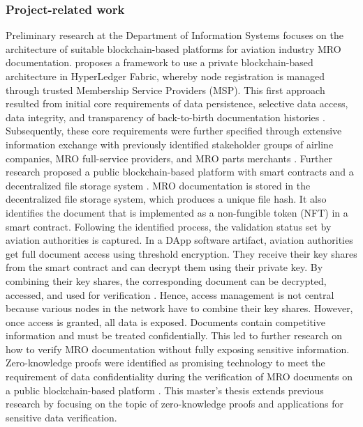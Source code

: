\subsubsection{Project-related work}
Preliminary research at the Department of Information Systems focuses on the architecture of suitable blockchain-based platforms for aviation industry MRO documentation. \citet{WickboldtMeiseKliewer} proposes a framework to use a private blockchain-based architecture in HyperLedger Fabric, whereby node registration is managed through trusted Membership Service Providers (MSP). This first approach resulted from initial core requirements of data persistence, selective data access, data integrity, and transparency of back-to-birth documentation histories \citep{WickboldtClemens2018BzdD}. Subsequently, these core requirements were further specified through extensive information exchange with previously identified stakeholder groups of airline companies, MRO full-service providers, and MRO parts merchants \citep{ZedelJ}. Further research proposed a public blockchain-based platform with smart contracts and a decentralized file storage system \citep{semesterproject, ZedelJ}. MRO documentation is stored in the decentralized file storage system, which produces a unique file hash. It also identifies the document that is implemented as a non-fungible token (NFT) in a smart contract. Following the identified process, the validation status set by aviation authorities is captured. In a DApp software artifact, aviation authorities get full document access using threshold encryption. They receive their key shares from the smart contract and can decrypt them using their private key. By combining their key shares, the corresponding document can be decrypted, accessed, and used for verification \citep{semesterproject}. Hence, access management is not central because various nodes in the network have to combine their key shares. However, once access is granted, all data is exposed. Documents contain competitive information and must be treated confidentially. This led to further research on how to verify MRO documentation without fully exposing sensitive information. Zero-knowledge proofs were identified as promising technology to meet the requirement of data confidentiality during the verification of MRO documents on a public blockchain-based platform \citep{ZedelJ}. This master's thesis extends previous research by focusing on the topic of zero-knowledge proofs and applications for sensitive data verification.

